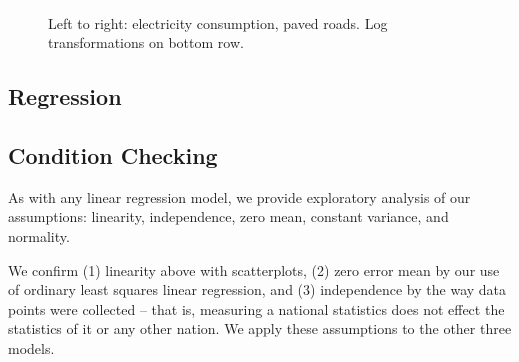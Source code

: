 \documentclass[12pt]{article}
\begin{document}
\begin{figure}[h!]
  \centering
  \includegraphics[width=\textwidth]{images/climate_model_scatter_elec_roads}
  \caption{\label{climate_model_scatter_elec_roads}Left to right: electricity consumption, paved roads. Log transformations on bottom row.}
\end{figure}


\subsection{Regression}

\subsection{Condition Checking}
As with any linear regression model, we provide exploratory analysis of our assumptions: linearity, independence, zero mean, constant variance, and normality.

We confirm (1) linearity above with scatterplots, (2) zero error mean by our use of ordinary least squares linear regression, and (3) independence by the way data points were collected -- that is, measuring a national statistics does not effect the statistics of it or any other nation. We apply these assumptions to the other three models.
\end{document}
